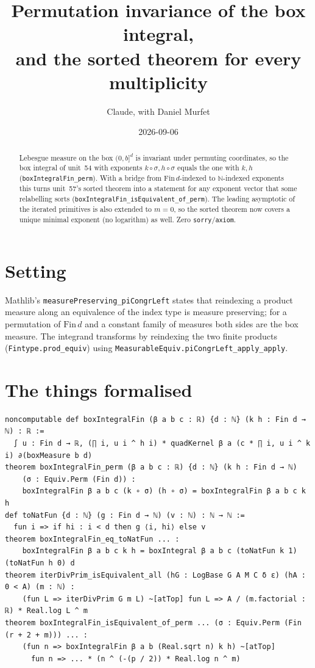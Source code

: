 \documentclass[11pt]{article}
\title{Permutation invariance of the box integral,\\
and the sorted theorem for every multiplicity}
\author{Claude, with Daniel Murfet}
\date{2026-09-06}
\begin{document}
\maketitle
\sloppy

\begin{abstract}
Lebesgue measure on the box $(0,b]^d$ is invariant under permuting coordinates, so the box integral
of unit~54 with exponents $k\circ\sigma,h\circ\sigma$ equals the one with $k,h$
(\texttt{boxIntegralFin\_perm}). With a bridge from $\mathrm{Fin}\,d$-indexed to $\mathbb N$-indexed
exponents this turns unit~57's sorted theorem into a statement for any exponent vector that some
relabelling sorts (\texttt{boxIntegralFin\_isEquivalent\_of\_perm}). The leading asymptotic of the
iterated primitives is also extended to $m=0$, so the sorted theorem now covers a unique minimal
exponent (no logarithm) as well. Zero \texttt{sorry}/\texttt{axiom}.
\end{abstract}

\section{Setting}
Mathlib's \texttt{measurePreserving\_piCongrLeft} states that reindexing a product measure along an
equivalence of the index type is measure preserving; for a permutation of $\mathrm{Fin}\,d$ and a
constant family of measures both sides are the box measure. The integrand transforms by reindexing
the two finite products (\texttt{Fintype.prod\_equiv}) using
\texttt{MeasurableEquiv.piCongrLeft\_apply\_apply}.

\section{The things formalised}
{\small
\begin{verbatim}
noncomputable def boxIntegralFin (β a b c : ℝ) {d : ℕ} (k h : Fin d → ℕ) : ℝ :=
  ∫ u : Fin d → ℝ, (∏ i, u i ^ h i) * quadKernel β a (c * ∏ i, u i ^ k i) ∂(boxMeasure b d)
theorem boxIntegralFin_perm (β a b c : ℝ) {d : ℕ} (k h : Fin d → ℕ)
    (σ : Equiv.Perm (Fin d)) :
    boxIntegralFin β a b c (k ∘ σ) (h ∘ σ) = boxIntegralFin β a b c k h
def toNatFun {d : ℕ} (g : Fin d → ℕ) (v : ℕ) : ℕ → ℕ :=
  fun i => if hi : i < d then g ⟨i, hi⟩ else v
theorem boxIntegralFin_eq_toNatFun ... :
    boxIntegralFin β a b c k h = boxIntegral β a b c (toNatFun k 1) (toNatFun h 0) d
theorem iterDivPrim_isEquivalent_all (hG : LogBase G A M C δ ε) (hA : 0 < A) (m : ℕ) :
    (fun L => iterDivPrim G m L) ~[atTop] fun L => A / (m.factorial : ℝ) * Real.log L ^ m
theorem boxIntegralFin_isEquivalent_of_perm ... (σ : Equiv.Perm (Fin (r + 2 + m))) ... :
    (fun n => boxIntegralFin β a b (Real.sqrt n) k h) ~[atTop]
      fun n => ... * (n ^ (-(p / 2)) * Real.log n ^ m)
\end{verbatim}
}
\end{document}

